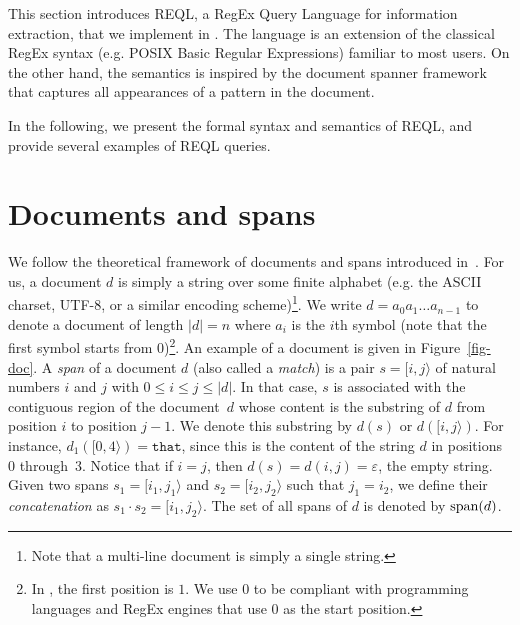 
This section introduces REQL, a RegEx Query Language for information extraction,
that we implement in \rematch. The language is an extension of the classical
RegEx syntax (e.g. POSIX Basic Regular Expressions) familiar to most users. On
the other hand, the semantics is inspired by the document spanner
framework~\citep{FaginKRV15} that captures all appearances of a pattern in the
document. 

In the following, we present the formal syntax and semantics of REQL, and
provide several examples of REQL queries.

\section{Documents and spans}

We follow the theoretical framework of documents and spans introduced
in~\citep{FaginKRV15}. For us, a document $d$ is simply a string over some
finite alphabet (e.g. the ASCII charset, UTF-8, or a similar encoding
scheme)\footnote{Note that a multi-line document is simply a single string.}. We
write $d = a_0a_1 \ldots a_{n-1}$ to denote a document of length $|d| = n$ where
$a_{i}$ is the $i$th symbol (note that the first symbol starts from
$0$)\footnote{In \citet{FaginKRV15}, the first position is $1$. We use $0$ to be
compliant with programming languages and RegEx engines that use $0$ as the start
position.}. An example of a document is given in Figure~\ref{fig-doc}. A
\emph{span} of a document $d$ (also called a \emph{match}) is a pair $s =
[i,j\rangle$ of natural numbers $i$ and $j$ with $0 \leq i \leq j\leq |d|$. In
that case, $s$ is associated with the contiguous region of the document~$d$
whose content is the substring of $d$ from position $i$ to position $j-1$. We
denote this substring by $d(s)$ or $d([i,j\rangle)$. For instance,
$d_1([0,4\rangle) = \texttt{that}$, since this is the content of the string $d$
in positions 0 through~3.
%
Notice that if $i = j$, then $d(s) = d(i,j) = \varepsilon$, the empty string.
Given two spans $s_1 = [i_1, j_1\rangle$ and $s_2 = [i_2, j_2\rangle$ such that
$j_1 = i_2$, we define their \emph{concatenation} as $s_1 \cdot s_2=[i_1,
j_2\rangle$. The set of all spans of $d$ is denoted by $\text{span}(d)$.



